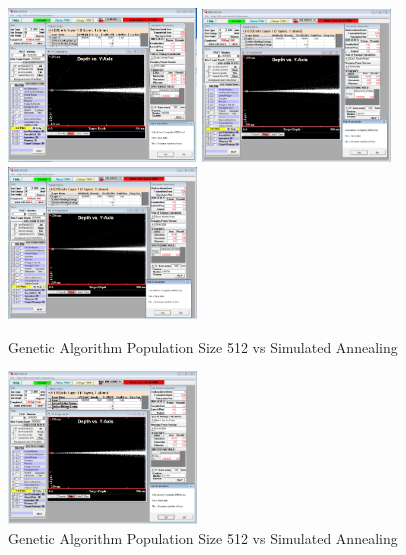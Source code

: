 \begin{figure}[!ht]
  \begin{center}
    \includegraphics[width=5.0cm]{appendix/srim_data/30MeV.png}
    \includegraphics[width=5.0cm]{appendix/srim_data/32MeV.png}
    \includegraphics[width=5.0cm]{appendix/srim_data/34MeV.png}
    \caption{Genetic Algorithm Population Size 512 vs Simulated Annealing}
    \label{fig:ga_vs_sim_512_3}
  \end{center}
\end{figure}

\begin{figure}[!ht]
  \begin{center}
    \includegraphics[width=5.0cm]{appendix/srim_data/36MeV.png}
    \caption{Genetic Algorithm Population Size 512 vs Simulated Annealing}
    \label{fig:ga_vs_sim_512_3}
  \end{center}
\end{figure}






